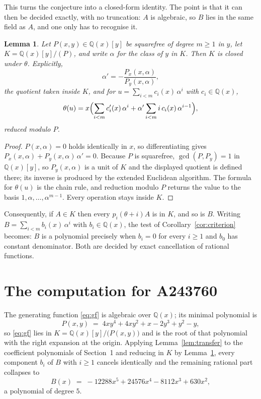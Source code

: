 \documentclass[11pt,a4paper]{article}
\theoremstyle{plain}
\newtheorem{lemma}[theorem]{Lemma}
\theoremstyle{definition}
\begin{document}
This turns the conjecture into a closed-form identity. The point is that it can then be
decided exactly, with no truncation: $A$ is algebraic, so $B$ lies in the same field as
$A$, and one only has to recognise it.

\begin{lemma}\label{lem:field}
Let $P(x,y)\in\mathbb{Q}(x)[y]$ be squarefree of degree $m\ge1$ in $y$, let
$K=\mathbb{Q}(x)[y]/(P)$, and write $\alpha$ for the class of $y$ in $K$. Then $K$ is
closed under $\theta$. Explicitly,
\[
\alpha'=-\frac{P_{x}(x,\alpha)}{P_{y}(x,\alpha)},
\]
the quotient taken inside $K$, and for $u=\sum_{i<m}c_{i}(x)\,\alpha^{i}$ with
$c_{i}\in\mathbb{Q}(x)$,
\[
\theta(u)=x\Bigl(\sum_{i<m}c_{i}'(x)\,\alpha^{i}
 +\alpha'\sum_{i<m}i\,c_{i}(x)\,\alpha^{i-1}\Bigr),
\]
reduced modulo $P$.
\end{lemma}

\begin{proof}
$P(x,\alpha)=0$ holds identically in $x$, so differentiating gives
$P_{x}(x,\alpha)+P_{y}(x,\alpha)\,\alpha'=0$. Because $P$ is squarefree,
$\gcd(P,P_{y})=1$ in $\mathbb{Q}(x)[y]$, so $P_{y}(x,\alpha)$ is a unit of $K$ and the
displayed quotient is defined there; its inverse is produced by the extended Euclidean
algorithm. The formula for $\theta(u)$ is the chain rule, and reduction modulo $P$ returns
the value to the basis $1,\alpha,\dots,\alpha^{m-1}$. Every operation stays inside $K$.
\end{proof}

Consequently, if $A\in K$ then every $p_{i}(\theta+i)A$ is in $K$, and so is $B$. Writing
$B=\sum_{i<m}b_{i}(x)\,\alpha^{i}$ with $b_{i}\in\mathbb{Q}(x)$, the test of
Corollary~\ref{cor:criterion} becomes: $B$ is a polynomial precisely when $b_{i}=0$ for
every $i\ge1$ and $b_{0}$ has constant denominator. Both are decided by exact
cancellation of rational functions.

\section{The computation for A243760}

The generating function \eqref{eq:gf} is algebraic over $\mathbb{Q}(x)$;
its minimal polynomial is
\[
P(x,y) \;=\; 4 x y^{4} + 4 x y^{2} + x - 2 y^{3} + y^{2} - y ,
\]
so \eqref{eq:gf} lies in $K=\mathbb{Q}(x)[y]/\bigl(P(x,y)\bigr)$ and is the root of that polynomial with the right
expansion at the origin. Applying Lemma~\ref{lem:transfer} to the coefficient polynomials
of Section~1 and reducing in $K$ by Lemma~\ref{lem:field}, every component $b_{i}$ of $B$
with $i\ge1$ cancels identically and the remaining rational part collapses to
\[
B(x)\;=\;- 12288 x^{5} + 24576 x^{4} - 8112 x^{3} + 630 x^{2} ,
\]
a polynomial of degree $5$.
\end{document}
